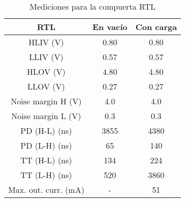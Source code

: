 \documentclass[../../e3_tp2_main.tex]{subfiles}
\begin{document}
\begin{table}[H]
	\centering
	\begin{tabular}{|c|c|c|}
	\hline
        \textbf{RTL}           	& En vac\'io	& Con carga \\ \hline \hline
	HLIV (V)                    & 0.80              	& 0.80           \\ \hline
	LLIV (V)                    	& 0.57               & 0.57         \\ \hline
	HLOV (V)                  	& 4.80               & 4.80         \\ \hline
	LLOV (V)                   	& 0.27               & 0.27                              \\ \hline
	Noise margin H (V)     & 4.0             	& 4.0                              \\ \hline
	Noise margin L (V)	& 0.3			& 0.3		\\ \hline
	PD (H-L) (ns)		& 3855              & 4380                        \\ \hline
	PD (L-H) (ns) 		& 65                 & 140             \\ \hline
	TT (H-L) (ns)   		& 134               & 224                   \\ \hline
	TT (L-H) (ns)   		& 520                & 3860                   \\ \hline
	Max. out. curr. (mA)   & -                    & 51                     \\ \hline

	\end{tabular}
	
	\caption{Mediciones para la compuerta RTL}
	\label{table:1-mediciones-rtl}
\end{table}
\end{document}
